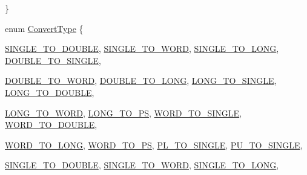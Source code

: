 \begin{DoxyCompactItemize}
 \}
\item 
enum \hyperlink{namespaceMipsISA_a3eb2ef7126c12e67d97d307c7aaa381d}{ConvertType} \{ \par
\hyperlink{namespaceMipsISA_a3eb2ef7126c12e67d97d307c7aaa381daa589dc496c4a7f6375b1d72eb4c7819f}{SINGLE\_\-TO\_\-DOUBLE}, 
\hyperlink{namespaceMipsISA_a3eb2ef7126c12e67d97d307c7aaa381da89fdb8efefb2aa91f56a83e7fda5d06e}{SINGLE\_\-TO\_\-WORD}, 
\hyperlink{namespaceMipsISA_a3eb2ef7126c12e67d97d307c7aaa381daab70f0a1659546fb3502da3d666ad3d6}{SINGLE\_\-TO\_\-LONG}, 
\hyperlink{namespaceMipsISA_a3eb2ef7126c12e67d97d307c7aaa381da809b874bf53fbd75995de5ea882e7d35}{DOUBLE\_\-TO\_\-SINGLE}, 
\par
\hyperlink{namespaceMipsISA_a3eb2ef7126c12e67d97d307c7aaa381dab0ac7a82a5700c458940d17816eb973b}{DOUBLE\_\-TO\_\-WORD}, 
\hyperlink{namespaceMipsISA_a3eb2ef7126c12e67d97d307c7aaa381da5e484ee7a59e7d6b054b12c742225665}{DOUBLE\_\-TO\_\-LONG}, 
\hyperlink{namespaceMipsISA_a3eb2ef7126c12e67d97d307c7aaa381da1deb8bbd76b01b2a0c68b23530ed2759}{LONG\_\-TO\_\-SINGLE}, 
\hyperlink{namespaceMipsISA_a3eb2ef7126c12e67d97d307c7aaa381da8f615b4003b99b6950e2cc48cf111c0f}{LONG\_\-TO\_\-DOUBLE}, 
\par
\hyperlink{namespaceMipsISA_a3eb2ef7126c12e67d97d307c7aaa381dae357946a1de8a0bbc7a82f1865768d8b}{LONG\_\-TO\_\-WORD}, 
\hyperlink{namespaceMipsISA_a3eb2ef7126c12e67d97d307c7aaa381da9551359c12029e5ae13eb7b83c948a0c}{LONG\_\-TO\_\-PS}, 
\hyperlink{namespaceMipsISA_a3eb2ef7126c12e67d97d307c7aaa381da8cc01247620be34987688d5c077e127f}{WORD\_\-TO\_\-SINGLE}, 
\hyperlink{namespaceMipsISA_a3eb2ef7126c12e67d97d307c7aaa381da8679fcc29997d3828b41aabf45575fe7}{WORD\_\-TO\_\-DOUBLE}, 
\par
\hyperlink{namespaceMipsISA_a3eb2ef7126c12e67d97d307c7aaa381da9aa0d2d62dcb8e62e0c284edb6893948}{WORD\_\-TO\_\-LONG}, 
\hyperlink{namespaceMipsISA_a3eb2ef7126c12e67d97d307c7aaa381daf532ef4dd1b95ed83ce611e6bbf24013}{WORD\_\-TO\_\-PS}, 
\hyperlink{namespaceMipsISA_a3eb2ef7126c12e67d97d307c7aaa381da9ae2e17dbe7603259fa4fe91fa26a5bd}{PL\_\-TO\_\-SINGLE}, 
\hyperlink{namespaceMipsISA_a3eb2ef7126c12e67d97d307c7aaa381da6352b1d55a1ed6f3abff04f0002f32a0}{PU\_\-TO\_\-SINGLE}, 
\par
\hyperlink{namespaceMipsISA_a3eb2ef7126c12e67d97d307c7aaa381daa589dc496c4a7f6375b1d72eb4c7819f}{SINGLE\_\-TO\_\-DOUBLE}, 
\hyperlink{namespaceMipsISA_a3eb2ef7126c12e67d97d307c7aaa381da89fdb8efefb2aa91f56a83e7fda5d06e}{SINGLE\_\-TO\_\-WORD}, 
\hyperlink{namespaceMipsISA_a3eb2ef7126c12e67d97d307c7aaa381daab70f0a1659546fb3502da3d666ad3d6}{SINGLE\_\-TO\_\-LONG}, 

\end{DoxyCompactItemize}

